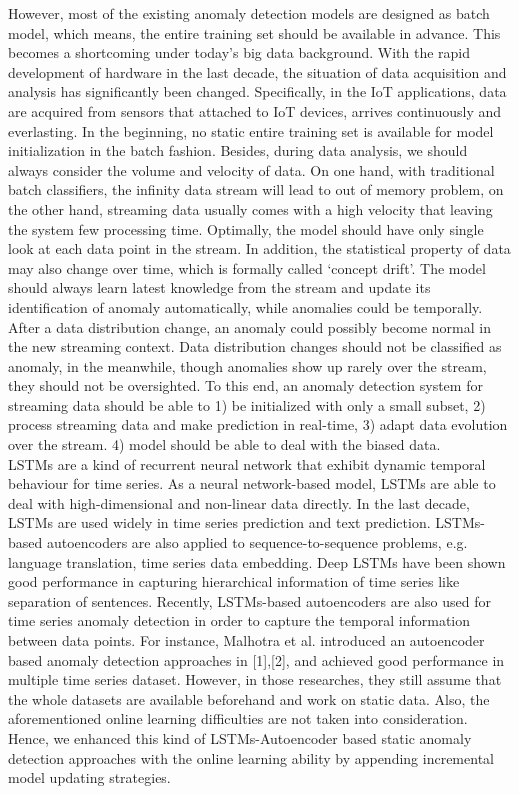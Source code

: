 However, most of the existing anomaly detection models are designed as batch model, which means, the entire training set should be available in advance. This becomes a shortcoming under today’s big data background. With the rapid development of hardware in the last decade, the situation of data acquisition and analysis has significantly been changed. Specifically, in the IoT applications, data are acquired from sensors that attached to IoT devices, arrives continuously and everlasting. In the beginning, no static entire training set is available for model initialization in the batch fashion. Besides, during data analysis, we should always consider the volume and velocity of data. On one hand, with traditional batch classifiers, the infinity data stream will lead to out of memory problem, on the other hand, streaming data usually comes with a high velocity that leaving the system few processing time. Optimally, the model should have only single look at each data point in the stream. In addition, the statistical property of data may also change over time, which is formally called ‘concept drift’. The model should always learn latest knowledge from the stream and update its identification of anomaly automatically, while anomalies could be temporally. After a data distribution change, an anomaly could possibly become normal in the new streaming context. Data distribution changes should not be classified as anomaly, in the meanwhile, though anomalies show up rarely over the stream, they should not be oversighted. To this end, an anomaly detection system for streaming data should be able to 1) be initialized with only a small subset, 2) process streaming data and make prediction in real-time, 3) adapt data evolution over the stream. 4) model should be able to deal with the biased data.\\

LSTMs are a kind of recurrent neural network that exhibit dynamic temporal behaviour for time series. As a neural network-based model, LSTMs are able to deal with high-dimensional and non-linear data directly. In the last decade, LSTMs are used widely in time series prediction and text prediction. LSTMs-based autoencoders are also applied to sequence-to-sequence problems, e.g. language translation, time series data embedding. Deep LSTMs have been shown good performance in capturing hierarchical information of time series like separation of sentences. Recently, LSTMs-based autoencoders are also used for time series anomaly detection in order to capture the temporal information between data points. For instance, Malhotra et al. introduced an autoencoder based anomaly detection approaches in [1],[2], and achieved good performance in multiple time series dataset. However, in those researches, they still assume that the whole datasets are available beforehand and work on static data. Also, the aforementioned online learning difficulties are not taken into consideration. Hence, we enhanced this kind of LSTMs-Autoencoder based static anomaly detection approaches with the online learning ability by appending incremental model updating strategies.\\

